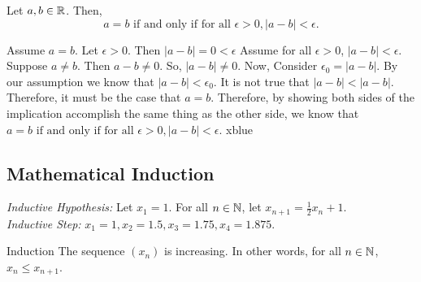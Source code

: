 \setcounter{BoxCounter}{5}
\begin{theorem}
    Let \(a,b \in \mathbb{R}\). Then, 
    \[
    a = b \text{ if and only if for all } \epsilon > 0, |a-b| < \epsilon.
    \]
\end{theorem}

\iffpf
{Assume \(a = b\). Let \(\epsilon > 0\). Then \(|a-b| = 0 < \epsilon\)}
{Assume for all \(\epsilon > 0\), \(|a-b| < \epsilon\). Suppose \(a \ne b\). Then \(a - b \ne 0\). So, \(|a-b| \ne 0\). Now, Consider \(\epsilon_0 = |a-b|\). By our assumption we know that \(|a-b| < \epsilon_0\). It is not true that \(|a-b| < |a - b|\). Therefore, it must be the case that \(a = b\).}
{Therefore, by showing both sides of the implication accomplish the same thing as the other side, we know that \(a = b \text{ if and only if for all } \epsilon > 0, |a-b| < \epsilon.\)}
{xblue}

\subsection{Mathematical Induction} \hfill

\textit{Inductive Hypothesis:} Let \(x_1 = 1\). For all \(n \in \mathbb{N}\), let \(x_{n+1} = \frac{1}{2}x_n + 1\). \\

\textit{Inductive Step:} \(x_1 = 1, x_2 = 1.5, x_3 = 1.75, x_4 = 1.875\). \\

\begin{example}
    {Induction} The sequence \((x_n)\) is increasing. In other words, for all \(n\in \mathbb{N}\), \(x_n \leq x_{n+1}\).
\end{example}


